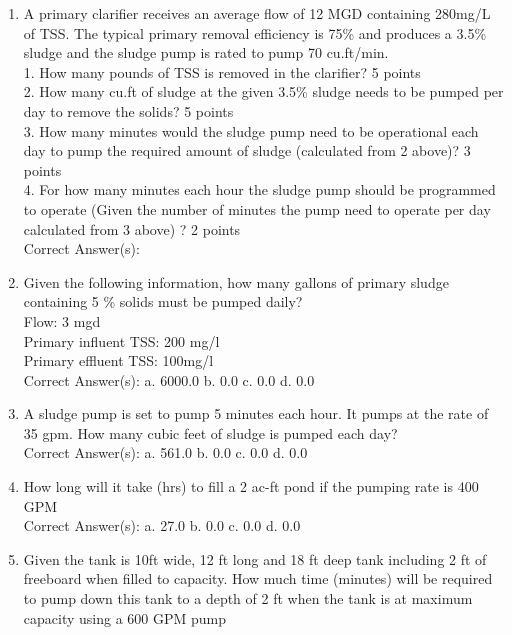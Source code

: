 \documentclass{article}
\begin{document}
\begin{enumerate}
\item  A primary clarifier receives an average flow of 12 MGD containing 280mg/L of TSS.  The typical primary removal efficiency is 75\% and produces a 3.5\% sludge and the sludge pump is rated to pump 70 cu.ft/min.\\
1.  How many pounds of TSS is removed in the clarifier?  5 points\\
2. How many cu.ft of sludge at the given 3.5\% sludge needs to be pumped per day to remove the solids?  5 points\\
3. How many minutes would the sludge pump need to be operational each day to pump the required amount of sludge (calculated from 2 above)? 3 points\\
4.  For how many minutes each hour the sludge pump should be programmed to operate (Given the number of minutes the pump need to operate per day calculated from 3 above) ?  2 points  \\

Correct Answer(s): \\

\item  Given the following information, how many gallons of primary sludge containing 5 \% solids must be pumped daily?\\
Flow:  3 mgd\\
Primary influent TSS:  200 mg/l\\
Primary effluent TSS: 100mg/l\\

Correct Answer(s):
a. 6000.0
b. 0.0
c. 0.0
d. 0.0 \\

\item  A sludge pump is set to pump 5 minutes each hour.  It pumps at the rate of 35 gpm.  How many cubic feet of sludge is pumped each day? \\

Correct Answer(s):
a. 561.0
b. 0.0
c. 0.0
d. 0.0 \\

\item  How long will it take (hrs) to fill a 2 ac-ft pond if the pumping rate is 400 GPM \\

Correct Answer(s):
a. 27.0
b. 0.0
c. 0.0
d. 0.0 \\

\item  Given the tank is 10ft wide, 12 ft long and 18 ft deep tank including 2 ft of freeboard when filled to capacity.  How much time (minutes) will be required to pump down this tank to a depth of 2 ft when the tank is at maximum capacity using a 600 GPM pump  \\


\end{enumerate}
\end{document}
